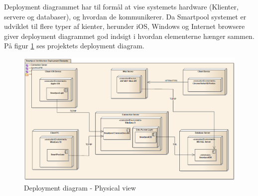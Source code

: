 Deployment diagrammet har til formål at vise systemets hardware (Klienter, servere og databaser), og hvordan de kommunikerer. Da Smartpool systemet er udviklet til flere typer af kienter, herunder iOS, Windows og Internet browsere giver deployment diagrammet god indsigt i hvordan elementerne hænger sammen.
På figur \ref{fig:deploymentView} ses projektets deployment diagram.
\begin{figure}
	\centering
	\includegraphics[width=\linewidth]{figs/arkitektur/deploymentView.PNG}
	\caption{Deployment diagram - Physical view}
	\label{fig:deploymentView}
\end{figure}

